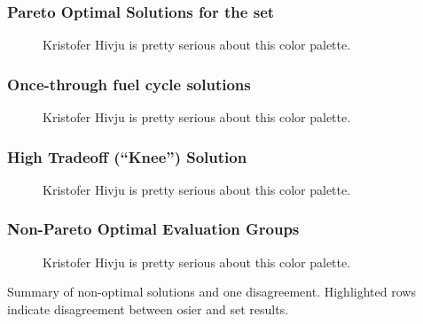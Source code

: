 \begin{frame}
  \frametitle{Pareto Optimal Solutions for the \gls{set}}
        
  \begin{figure}[htbp!]
    \begin{center}
      \resizebox{0.85\columnwidth}{!}{}
    \end{center}
          \caption{Kristofer Hivju is pretty serious about this color palette.}
    \label{fig:full-set-pcp}
  \end{figure}
\end{frame}

\begin{frame}
  \frametitle{Once-through fuel cycle solutions}
        
  \begin{figure}[htbp!]
    \begin{center}
      \resizebox{0.85\columnwidth}{!}{}
    \end{center}
          \caption{Kristofer Hivju is pretty serious about this color palette.}
    \label{fig:once-through-pcp}
  \end{figure}
\end{frame}

\begin{frame}
  \frametitle{High Tradeoff (``Knee'') Solution}
        
  \begin{figure}[htbp!]
    \begin{center}
      \resizebox{0.85\columnwidth}{!}{}
    \end{center}
          \caption{Kristofer Hivju is pretty serious about this color palette.}
    \label{fig:single-eg-pcp}
  \end{figure}
\end{frame}

\begin{frame}
  \frametitle{Non-Pareto Optimal Evaluation Groups}
        
  \begin{figure}[htbp!]
    \begin{center}
      \resizebox{0.85\columnwidth}{!}{}
    \end{center}
          \caption{Kristofer Hivju is pretty serious about this color palette.}
    \label{fig:non-optimal-pcp}
  \end{figure}
\end{frame}


\begin{frame}
    \begin{table}
        \centering
        \caption{Summary of non-optimal solutions and one disagreement. Highlighted rows indicate disagreement between \Gls{osier} and \Gls{set} results.}
        \label{tab:non-optimal-subset}
        \resizebox{0.8\columnwidth}{!}{}
    \end{table}
\end{frame}